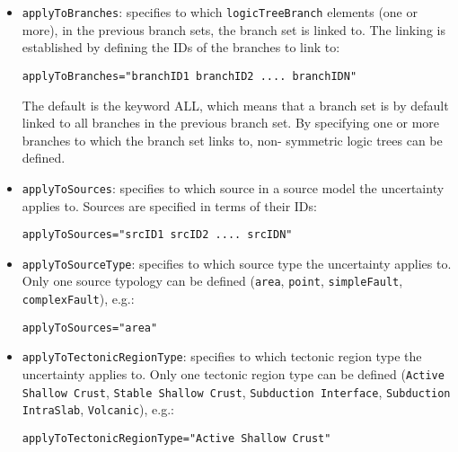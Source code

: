 \begin{itemize}

    \item \Verb+applyToBranches+: specifies to which \Verb+logicTreeBranch+
	elements (one or more), in the previous branch sets, the branch set
	is linked to. The linking is established by defining the IDs of the
	branches to link to:

	\begin{Verbatim}[commandchars=\\\{\}, samepage=true]
	applyToBranches="branchID1 branchID2 .... branchIDN"
	\end{Verbatim}

    The default is the keyword ALL, which means that a branch set is by
    default linked to all branches in the previous branch set. By
    specifying one or  more branches to which the branch set links to, non-
    symmetric logic trees can be defined.

    \item \Verb+applyToSources+: specifies to which source in a source model
	the uncertainty applies to. Sources are specified in terms of their IDs:

	\begin{Verbatim}[commandchars=\\\{\}, samepage=true]
	applyToSources="srcID1 srcID2 .... srcIDN"
	\end{Verbatim}

    \item \Verb+applyToSourceType+: specifies to which source type the
	uncertainty applies to.  Only one source typology can be defined
	(\Verb+area+, \Verb+point+, \Verb+simpleFault+, \Verb+complexFault+), e.g.:

	\begin{Verbatim}[commandchars=\\\{\}, samepage=true]
	applyToSources="area"
	\end{Verbatim}

    \item \Verb+applyToTectonicRegionType+: specifies to which tectonic
	region type the uncertainty applies to. Only one tectonic region type can
	be defined (\texttt{Active Shallow Crust}, \texttt{Stable
	Shallow Crust}, \texttt{Subduction Interface}, \texttt{Subduction}
	\texttt{IntraSlab}, \texttt{Volcanic}), e.g.:

	\begin{Verbatim}[commandchars=\\\{\}]
	applyToTectonicRegionType="Active Shallow Crust"
	\end{Verbatim}

\end{itemize}
